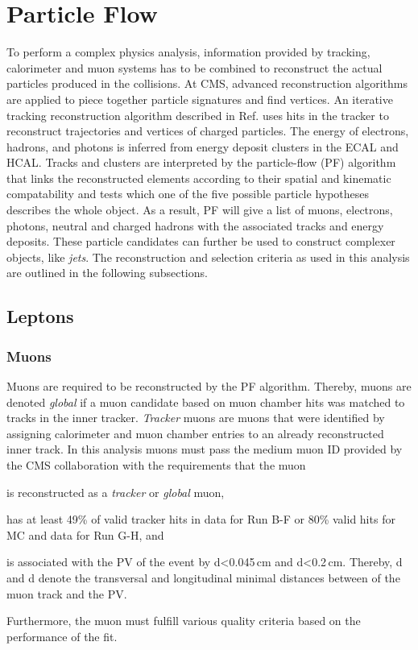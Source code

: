 \section{Particle Flow}

To perform a complex physics analysis, information provided by tracking, calorimeter and muon systems has to be
combined to reconstruct the actual particles produced in the collisions. At CMS, advanced reconstruction algorithms are 
applied to piece together particle signatures and find vertices. An iterative tracking reconstruction algorithm described in 
Ref. \cite{trackreco} uses hits in the tracker to reconstruct trajectories and vertices of charged particles. 
The energy of electrons, hadrons, and photons is inferred from energy deposit clusters in the ECAL and HCAL. Tracks and clusters are interpreted by the particle-flow (PF) algorithm \cite{1748-0221-12-10-P10003} that
links the reconstructed elements according to their spatial and kinematic compatability and tests which one of the five possible particle hypotheses describes the whole object. As a result, PF will give a list
of muons, electrons, photons, neutral and charged hadrons with the associated tracks and energy deposits. These particle candidates can further be
used to construct complexer objects, like \textit{jets}.
The reconstruction and selection criteria as used in this analysis are outlined in the following subsections. 
\clearpage
\subsection{Leptons}

\subsubsection{Muons}
Muons are required to be reconstructed by the PF algorithm. Thereby, muons are denoted  \textit{global} if a muon candidate based on muon chamber hits was matched to tracks in the inner tracker.
\textit{Tracker} muons are muons that were identified by assigning calorimeter and muon chamber entries to an already reconstructed inner track.
 In this analysis muons must pass the medium muon ID provided by the CMS collaboration \cite{muonID} with the requirements that the muon
\begin{ct_version_list}
    \item is reconstructed as a \textit{tracker} or \textit{global} muon, 
    \item has at least 49\% of valid tracker hits in data for Run B-F or 80\% valid hits for MC and data for Run G-H, and 
    \item is associated with the PV of the event by d<0.045\,{cm} and d<0.2\,{cm}. Thereby, d and d denote the transversal and longitudinal minimal distances between of the muon track and the PV.
\end{ct_version_list}
Furthermore, the muon must fulfill various quality criteria based on the performance of the fit.

